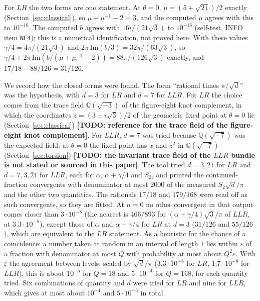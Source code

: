 \documentclass[11pt]{amsart}
\newcommand{\todo}[1]{\textbf{[TODO: #1]}}
\theoremstyle{definition}
\theoremstyle{remark}
\begin{document}
For $LR$ the two forms are one statement. At $\theta = 0$, $\mu = (5+\sqrt{21})/2$
exactly (Section~\ref{sec:classical}), so $\mu + \mu^{-1} - 2 = 3$, and the computed
$\mu$ agrees with this to $10^{-16}$. The computed $b$ agrees with
$16i/(21\sqrt3)$ to $10^{-16}$ (self-test, INFO item \texttt{NF4}); this is a numerical
identification, not proved here. With these values $\gamma/4 = 4\pi/(21\sqrt3)$ and
$2\pi\,\mathrm{Im}(b/3) = 32\pi/(63\sqrt3)$, so $\gamma/4 +
2\pi\,\mathrm{Im}(b/(\mu+\mu^{-1}-2)) = 88\pi/(126\sqrt3)$ exactly, and
$17/18 - 88/126 = 31/126$.

We record how the closed forms were found. The form ``rational times $\pi/\sqrt d$''
was the hypothesis, with $d = 3$ for $LR$ and $d = 7$ for $LLR$. For $LR$ the choice
comes from the trace field $\mathbb{Q}(\sqrt{-3})$ of the figure-eight knot complement,
in which the coordinates $z = (3 \pm i\sqrt3)/2$ of the geometric fixed point at
$\theta = 0$ lie (Section~\ref{sec:classical}) \todo{reference for the trace field of
the figure-eight knot complement}. For $LLR$, $d = 7$ was tried because
$\mathbb{Q}(\sqrt{-7})$ was the expected field: at $\theta = 0$ the fixed point has $x$
and $z^2$ in $\mathbb{Q}(\sqrt{-7})$ (Section~\ref{sec:torsion}) \todo{the invariant
trace field of the $LLR$ bundle is not stated or sourced in this paper}. The tool tried
$d = 3, 21$ for $LR$ and $d = 7, 3, 21$ for $LLR$, each for $\alpha$,
$\alpha + \gamma/4$ and $S_2$, and printed the continued-fraction convergents with
denominator at most $2000$ of the measured $S_2\sqrt d/\pi$ and the other two
quantities. The rationals $17/18$ and $179/168$ were read off as such convergents, so
they are fitted. At $n = 0$ no other convergent in that output comes closer than
$3\cdot10^{-8}$ (the nearest is $466/893$ for $(\alpha + \gamma/4)\sqrt3/\pi$ of
$LLR$, at $3.3\cdot10^{-8}$), except those of $\alpha$ and $\alpha + \gamma/4$ for $LR$ at $d = 3$
($31/126$ and $55/126$), which are equivalent to the $LR$ statement. As a heuristic for
the chance of a coincidence: a number taken at random in an interval of length $1$
lies within $\varepsilon$ of a fraction with denominator at most $Q$ with probability at
most about $Q^2\varepsilon$. With $\varepsilon$ the agreement between levels, scaled
by $\sqrt d/\pi$ ($3.3\cdot10^{-8}$ for $LR$, $1.7\cdot10^{-8}$ for $LLR$), this is
about $10^{-5}$ for $Q = 18$ and $5\cdot10^{-4}$ for $Q = 168$, for each quantity
tried. Six combinations of quantity and $d$ were tried for $LR$ and nine for $LLR$,
which gives at most about $10^{-4}$ and $5\cdot10^{-3}$ in total.
\end{document}
